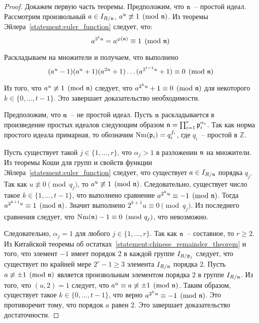 \documentclass[_00_dissertation.tex]{subfiles}
\begin{document}
\begin{proof}
    Докажем первую часть теоремы.
    Предположим, что $\mathfrak{n}$~-- простой идеал.
    Рассмотрим произвольный $a \in I_{R/\mathfrak{n}}$, $a^u \not\equiv 1 \pmod{\mathfrak{n}}$.
    Из теоремы Эйлера~\ref{statement:euler_function} следует, что:
    \begin{equation*}
        a^{2^{t} u} = a^{\varphi(\mathfrak{n})} \equiv 1 \pmod{\mathfrak{n}}
    \end{equation*}

    Раскладываем на множители и получаем, что выполнено
    \begin{equation*}
        (a^{u} - 1)(a^{u} + 1)(a^{2u} + 1)\dots(a^{2^{t-1}u} + 1) \equiv 0 \pmod{\mathfrak{n}}
    \end{equation*}

    Из того, что $a^{u} \not\equiv 1 \pmod{\mathfrak{n}}$ следует, что $a^{2^{k}u} + 1 \equiv 0 \pmod{\mathfrak{n}}$ для некоторого $k\in \{0, \dots, t-1\}$.
    Это завершает доказательство необходимости.

    Предположим, что $\mathfrak{n}$~-- не простой идеал.
    Пусть $\mathfrak{n}$ раскладывается в произведение простых идеалов следующим образом $\mathfrak{n} = \prod_{i=1}^{r} \mathfrak{p}_i^{\alpha_i}$.
    Так как норма простого идеала примарная, то обозначим $\textrm{Nm}(\mathfrak{p}_i) = q_i^{f_i}$, где $q_i$~-- простой в $\mathbb{Z}$.

    Пусть существует такой $j \in \{1, \dots, r\}$, что $\alpha_j > 1$ в разложении $\mathfrak{n}$ на множители.
    Из теоремы Коши для групп и свойств функции Эйлера~\ref{statement:euler_function} следует, что существует $a \in I_{R/\mathfrak{n}}$ порядка $q_j$.
    Так как $u \not\equiv 0 \pmod{q_j}$, то $a^u \not\equiv 1 \pmod{\mathfrak{n}}$.
    Следовательно, существует число такое $k \in \{1, \dots, t-1\}$, что выполнено сравнение $a^{2^{k}u} \equiv -1 \pmod{\mathfrak{n}}$.
    Тогда $a^{2^{k+1}u} \equiv 1 \pmod{\mathfrak{n}}$.
    Значит выполнено $2^{k+1}u \equiv 0 \pmod{q_j}$.
    Из последнего сравнения следует, что $\textrm{Nm}(\mathfrak{n}) - 1 \equiv 0 \pmod{q_j}$, что невозможно.
    
    Следовательно, $\alpha_j = 1$ для любого $j \in \{1, \ldots, r\}$.
    Так как $\mathfrak{n}$~-- составное, то $r \ge 2$.
    Из Китайской теоремы об остатках~\ref{statement:chinese_remainder_theorem} и того, что элемент $-1$ имеет порядок $2$ в каждой группе $I_{R/\mathfrak{p}_j}$ следует, что существует по крайней мере $2^r-1 \ge 3$ элемента $I_{R/\mathfrak{n}}$ порядка $2$.
    Пусть $a \not\equiv \pm 1 \pmod{\mathfrak{n}}$ является произвольным элементом порядка $2$ в группе $I_{R/\mathfrak{n}}$.
    Из того, что $(u, 2) = 1$ следует, что $a^u \equiv a \not\equiv \pm 1 \pmod{\mathfrak{n}}$.
    Таким образом, существует такое $k \in \{0,\ldots, t-1\}$, что верно $a^{2^{k}u} \equiv -1 \pmod{\mathfrak{n}}$.
    Это противоречит тому, что порядок $a$ равен $2$.
    Это завершает доказательство достаточности.


\end{proof}
\end{document}
